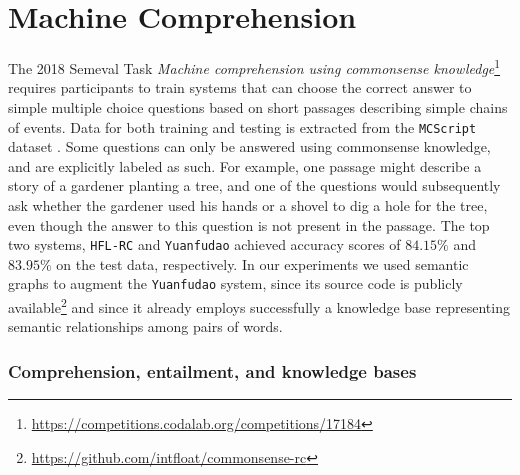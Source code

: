 \chapter{Machine Comprehension}
\label{chap:comprehension}
The 2018 Semeval Task \textit{Machine comprehension using commonsense
	knowledge}\footnote{\url{https://competitions.codalab.org/competitions/17184}}
requires participants to train systems that can choose the
correct answer to simple multiple choice questions based on short
passages describing simple chains of events. Data for both training and
testing is extracted from the \texttt{MCScript} dataset
\cite{Ostermann:2018}. Some questions can only be
answered using commonsense knowledge, and are
explicitly labeled as such. For example, one passage might describe a
story of a gardener planting a tree, and one of the questions would
subsequently ask whether the gardener used his hands or a shovel to dig
a hole for the tree, even though the answer to this question is not
present in the passage. The top two systems, \texttt{HFL-RC}
\cite{Chen:2018} and
\texttt{Yuanfudao} \cite{Wang:2018} achieved accuracy scores of
$84.15\%$ and $83.95\%$ on the test data, respectively. In our experiments we used
semantic graphs to augment the \texttt{Yuanfudao} system, since its source
code is publicly
available\footnote{\url{https://github.com/intfloat/commonsense-rc}} and since it already employs successfully a
knowledge base representing semantic relationships among pairs of words.

\subsection{Comprehension, entailment, and knowledge bases}

